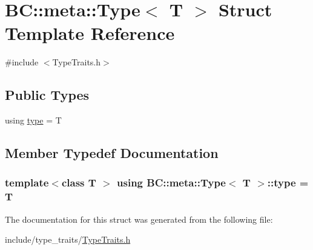 \hypertarget{structBC_1_1meta_1_1Type}{}\section{BC\+:\+:meta\+:\+:Type$<$ T $>$ Struct Template Reference}
\label{structBC_1_1meta_1_1Type}


{\ttfamily \#include $<$Type\+Traits.\+h$>$}

\subsection*{Public Types}
\begin{DoxyCompactItemize}
\item 
using \hyperlink{structBC_1_1meta_1_1Type_a628004ec924b9634124a1bb9c494ebcf}{type} = T
\end{DoxyCompactItemize}


\subsection{Member Typedef Documentation}
\subsubsection[{\texorpdfstring{type}{type}}]{\setlength{\rightskip}{0pt plus 5cm}template$<$class T $>$ using {\bf B\+C\+::meta\+::\+Type}$<$ T $>$\+::{\bf type} =  T}\hypertarget{structBC_1_1meta_1_1Type_a628004ec924b9634124a1bb9c494ebcf}{}\label{structBC_1_1meta_1_1Type_a628004ec924b9634124a1bb9c494ebcf}


The documentation for this struct was generated from the following file\+:\begin{DoxyCompactItemize}
\item 
include/type\+\_\+traits/\hyperlink{TypeTraits_8h}{Type\+Traits.\+h}\end{DoxyCompactItemize}
